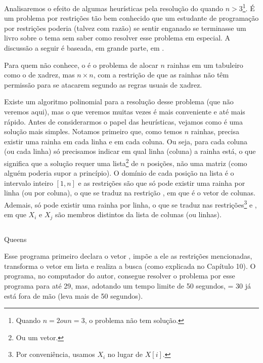 \documentclass{article}
\begin{document}
Analisaremos o efeito de algumas heurísticas pela resolução do  quando $n > 3$\footnote{Quando $n = 2 ou n = 3$, o problema não tem solução.}. É um
problema por restrições tão bem conhecido que um estudante de programação por
restrições poderia (talvez com razão) se sentir enganado se terminasse um livro sobre o tema sem saber
como resolver esse problema em especial. A discussão a seguir é baseada, em grande parte, em
\cite{krzysztof}.

Para quem não conhece, o  é o problema de alocar $n$ rainhas em um
tabuleiro como o de xadrez, mas $n\times n$, com a restrição de que as rainhas não têm permissão
para se atacarem segundo as regras usuais de xadrez.

Existe um algoritmo polinomial para a resolução desse problema (que não veremos aqui), mas o que
veremos muitas vezes é mais conveniente e até mais rápido. Antes de considerarmos o papel das
heurísticas, vejamos como é uma solução mais simples. Notamos primeiro que, como temos $n$ rainhas,
precisa existir uma rainha em cada linha e em cada coluna. Ou seja, para cada coluna (ou cada linha)
só precisamos indicar em qual linha (coluna) a rainha está, o que significa que a solução requer uma
lista\footnote{Ou um vetor.} de $n$ posições, não uma matriz (como alguém poderia supor a princípio). O domínio de cada
posição na lista é o intervalo inteiro $[1,n]$ e as restrições são que só pode existir uma rainha
por linha (ou por coluna), o que se traduz na restrição , em que
 é o vetor de colunas. Ademais, só pode existir uma rainha por linha, o que se traduz nas
restrições\footnote{Por conveniência, usamos $X_i$ no lugar de $X[i]$.}  e , em que $X_i$ e $X_j$ são membros distintos da lista de colunas (ou linhas).

    \begin{listing}[H]
    \inputminted{prolog}{../Exemplos/Cap11/prog1_queens.ecl}
    \caption{Queens}
    \end{listing}

Esse programa primeiro declara o vetor , impõe a ele as restrições mencionadas,
transforma o vetor em lista e realiza a busca (como explicada no Capítulo 10).%
 O programa, no computador do autor, consegue resolver o problema por esse programa para  até 29,
mas, adotando um tempo limite de 50 segundos,  = 30 já está fora de mão (leva mais de 50
segundos).
\end{document}
